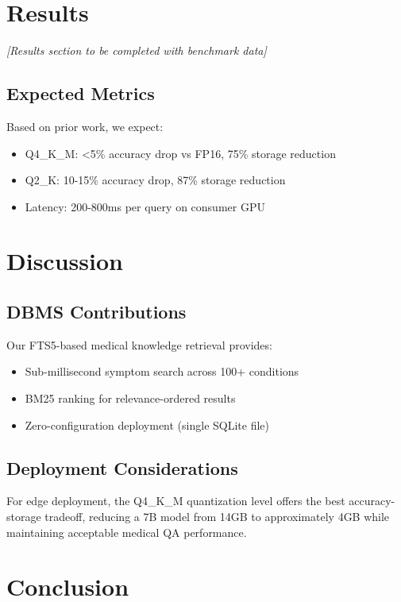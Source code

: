 \documentclass[conference]{IEEEtran}
\begin{document}
\section{Results}

\textit{[Results section to be completed with benchmark data]}

\subsection{Expected Metrics}

Based on prior work, we expect:
\begin{itemize}
    \item Q4\_K\_M: <5\% accuracy drop vs FP16, 75\% storage reduction
    \item Q2\_K: 10-15\% accuracy drop, 87\% storage reduction
    \item Latency: 200-800ms per query on consumer GPU
\end{itemize}

\section{Discussion}

\subsection{DBMS Contributions}

Our FTS5-based medical knowledge retrieval provides:
\begin{itemize}
    \item Sub-millisecond symptom search across 100+ conditions
    \item BM25 ranking for relevance-ordered results
    \item Zero-configuration deployment (single SQLite file)
\end{itemize}

\subsection{Deployment Considerations}

For edge deployment, the Q4\_K\_M quantization level offers the best accuracy-storage tradeoff, reducing a 7B model from 14GB to approximately 4GB while maintaining acceptable medical QA performance.

\section{Conclusion}
\end{document}
